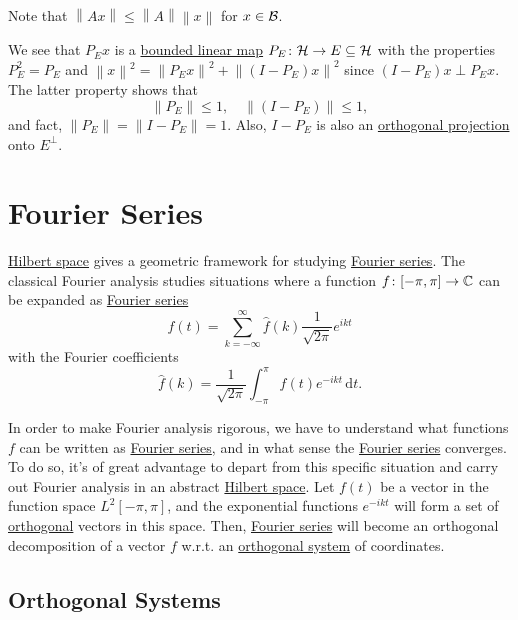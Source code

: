 \begin{remark}
	Note that \(\left\lVert Ax\right\rVert \leq \left\lVert A\right\rVert \left\lVert x\right\rVert \) for \(x\in \mathcal{\MakeUppercase{b}} \).
\end{remark}

We see that \(P_E x\) is a \hyperref[def:bounded-linear-map]{bounded linear map} \(P_E\colon \mathcal{\MakeUppercase{h}} \to E\subseteq \mathcal{\MakeUppercase{h}}\) with the properties \(P^{2} _E = P_E\) and \(\left\lVert x\right\rVert ^{2} = \left\lVert P_E x\right\rVert ^{2} + \left\lVert (I - P_E)x\right\rVert ^{2} \) since \((I - P_E)x\perp P_E x\). The latter property shows that
\[
	\left\lVert P_E\right\rVert \leq 1,\quad \left\lVert (I - P_E)\right\rVert \leq 1,
\]
and fact, \(\left\lVert P_E\right\rVert = \left\lVert I-P_E\right\rVert = 1\). Also, \(I - P_E\) is also an \hyperref[def:orthogonal-projection]{orthogonal projection} onto \(E^\perp\).

\section{Fourier Series}
\hyperref[def:Hilbert-space]{Hilbert space} gives a geometric framework for studying \hyperref[def:Fourier-series]{Fourier series}. The classical Fourier analysis studies situations where a function \(f\colon [-\pi , \pi ]\to \mathbb{\MakeUppercase{c}} \) can be expanded as \hyperref[def:Fourier-series]{Fourier series}
\[
	f(t) = \sum_{k=-\infty }^{\infty} \hat{f} (k) \frac{1}{\sqrt{2\pi } }e^{ikt}
\]
with the Fourier coefficients
\[
	\hat{f} (k) = \frac{1}{\sqrt{2\pi } }\int _{-\pi}^\pi f(t) e^{-ikt}\,\mathrm{d} t.
\]

In order to make Fourier analysis rigorous, we have to understand what functions \(f\) can be written as \hyperref[def:Fourier-series]{Fourier series}, and in what sense the \hyperref[def:Fourier-series]{Fourier series} converges. To do so, it's of great advantage to depart from this specific situation and carry out Fourier analysis in an abstract \hyperref[def:Hilbert-space]{Hilbert space}. Let \(f(t)\) be a vector in the function space \(L^2[-\pi , \pi ]\), and the exponential functions \(e^{-ikt}\) will form a set of \hyperref[def:orthogonal]{orthogonal} vectors in this space. Then, \hyperref[def:Fourier-series]{Fourier series} will become an orthogonal decomposition of a vector \(f\) w.r.t. an \hyperref[def:orthogonal-system]{orthogonal system} of coordinates.

\subsection{Orthogonal Systems}

